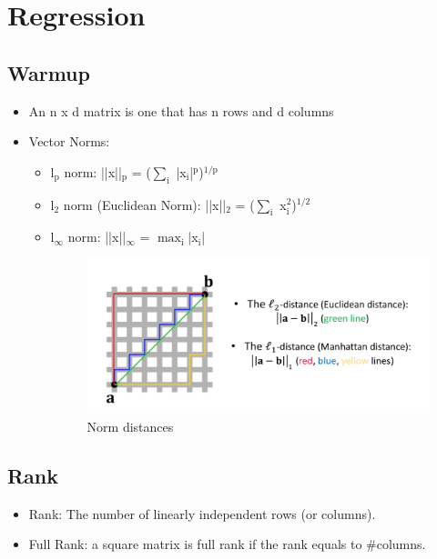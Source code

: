 \documentclass[11pt]{article}
\author{Andrew Chen}
\date{\today}
\title{}
\begin{document}
\tableofcontents

\section{Regression}
\label{sec:org9ebda85}

\subsection{Warmup}
\label{sec:org56f4fe9}

\begin{itemize}
\item An n x d matrix is one that has n rows and d columns
\item Vector Norms:
\begin{itemize}
\item l\(_{\text{p}}\) norm: ||x||\(_{\text{p}}\) = (\(\sum_{\text{i}}\) |x\(_{\text{i}}\)|\(^{\text{p}}\))\(^{\text{1/p}}\)
\item l\(_{\text{2}}\) norm (Euclidean Norm): ||x||\(_{\text{2}}\) = (\(\sum_{\text{i}}\) x\(_{\text{i}}^{\text{2}}\))\(^{\text{1/2}}\)
\item l\(_{\infty}\) norm: ||x||\(_{\infty}\) = \(\max_{\text{i}}\)|x\(_{\text{i}}\)|

\begin{figure}[htbp]
\centering
\includegraphics[width=.9\linewidth]{./images/norm_distances.png}
\caption{Norm distances}
\end{figure}
\end{itemize}
\end{itemize}

\subsection{Rank}
\label{sec:org3e75e31}

\begin{itemize}
\item Rank: The number of linearly independent rows (or columns).
\item Full Rank: a square matrix is full rank if the rank equals to \#columns.
\end{itemize}
\end{document}
